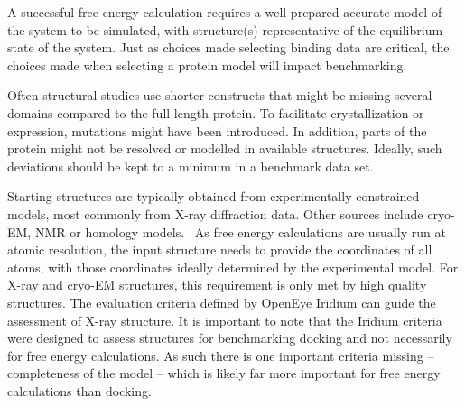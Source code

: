 \documentclass[9pt,bestpractices]{livecoms}
\begin{document}

A successful free energy calculation requires a well prepared accurate model of the system to be simulated, with structure(s) representative of the equilibrium state of the system. Just as choices made selecting binding data are critical, the choices made when selecting a protein model will impact benchmarking.

Often structural studies use shorter constructs that might be missing several domains compared to the full-length protein. To facilitate crystallization or expression, mutations might have been introduced. In addition, parts of the protein might not be resolved or modelled in available structures. Ideally, such deviations should be kept to a minimum in a benchmark data set.
%

Starting structures are typically obtained from experimentally constrained models, most commonly from X-ray diffraction data.
Other sources include cryo-EM, NMR or homology models.~\cite{courniaRelativeBindingFree2017,courniaRigorousFreeEnergy2020,schindler_largescale_2020}
As free energy calculations are usually run at atomic resolution, the input structure needs to provide the coordinates of all atoms, with those coordinates ideally determined by the experimental model.
%
For X-ray and cryo-EM structures, this requirement is only met by high quality structures.
The evaluation criteria defined by OpenEye Iridium\cite{warrenEssentialConsiderationsUsing2012} can guide the assessment of X-ray structure. It is important to note that the Iridium criteria were designed to assess structures for benchmarking docking and not necessarily for free energy calculations. As such there is one important criteria missing -- completeness of the model -- which is likely far more important for free energy calculations than docking.
\end{document}
